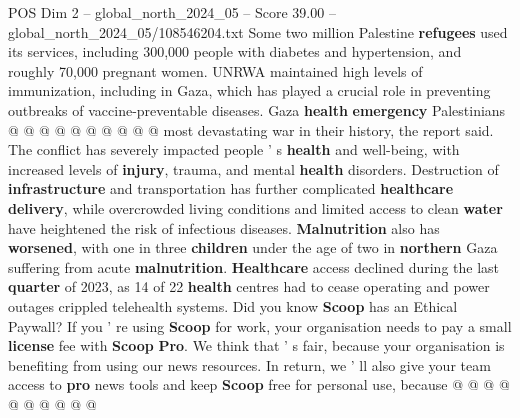 \begin{textsample}{POS Dim 2 – global\_north\_2024\_05 – Score 39.00 – global\_north\_2024\_05/108546204.txt}
Some two million Palestine \textbf{refugees} used its services, including 300,000 people with diabetes and hypertension, and roughly 70,000 pregnant women.
UNRWA maintained high levels of immunization, including in Gaza, which has played a crucial role in preventing outbreaks of vaccine-preventable diseases.
Gaza \textbf{health} \textbf{emergency} Palestinians @ @ @ @ @ @ @ @ @ @ most devastating war in their history, the report said.
The conflict has severely impacted people ' s \textbf{health} and well-being, with increased levels of \textbf{injury}, trauma, and mental \textbf{health} disorders.
Destruction of \textbf{infrastructure} and transportation has further complicated \textbf{healthcare} \textbf{delivery}, while overcrowded living conditions and limited access to clean \textbf{water} have heightened the risk of infectious diseases. \textbf{Malnutrition} also has \textbf{worsened}, with one in three \textbf{children} under the age of two in \textbf{northern} Gaza suffering from acute \textbf{malnutrition}. \textbf{Healthcare} access declined during the last \textbf{quarter} of 2023, as 14 of 22 \textbf{health} centres had to cease operating and power outages crippled telehealth systems.
Did you know \textbf{Scoop} has an Ethical Paywall?
If you ' re using \textbf{Scoop} for work, your organisation needs to pay a small \textbf{license} fee with \textbf{Scoop} \textbf{Pro}.
We think that ' s fair, because your organisation is benefiting from using our news resources.
In return, we ' ll also give your team access to \textbf{pro} news tools and keep \textbf{Scoop} free for personal use, because @ @ @ @ @ @ @ @ @ @

\end{textsample}
